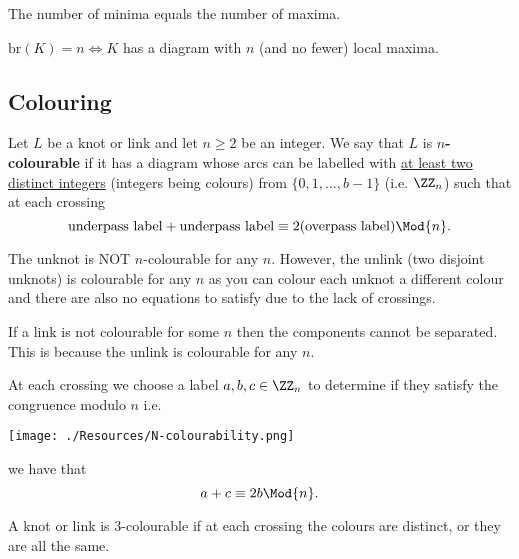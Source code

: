 \documentclass[12pt, a4paper]{article}
\begin{document}
\begin{proposition}
    The number of minima equals the number of maxima.
\end{proposition}

\begin{mdthm}
    \(\text{br}(K)=n \iff K\) has a diagram with \(n\) (and no fewer) local maxima.
\end{mdthm}

\subsection{Colouring}

\begin{definition}
    Let \(L\) be a knot or link and let \(n\geq 2\) be an integer. We say that \(L\) is \(n\)\textbf{-colourable} if it has a diagram whose arcs can be labelled with \underline{at least two distinct integers} (integers being colours) from \(\{0,1,\ldots,b-1\}\) (i.e. \(\ZZ_n\)) such that at each crossing 
    \[\text{underpass label}+\text{underpass label} \equiv 2(\text{overpass label}) \Mod{n}.\]
\end{definition}

\begin{mdremark}
    The unknot is NOT \(n\)-colourable for any \(n\). However, the unlink (two disjoint unknots) is colourable for any \(n\) as you can colour each unknot a different colour and there are also no equations to satisfy due to the lack of crossings.
\end{mdremark}

\begin{proposition}
    If a link is not colourable for some \(n\) then the components cannot be separated. This is because the unlink is colourable for any \(n\).
\end{proposition}

\begin{example}
    At each crossing we choose a label \(a,b,c \in \ZZ_n\) to determine if they satisfy the congruence modulo \(n\) i.e.
    \begin{center}
        \texttt{[image: ./Resources/N-colourability.png]}
    \end{center}
    we have that 
    \[a+c \equiv 2b \Mod{n}.\]
\end{example}

\begin{mdremark}
    A knot or link is \(3\)-colourable if at each crossing the colours are distinct, or they are all the same.
\end{mdremark}
\end{document}

